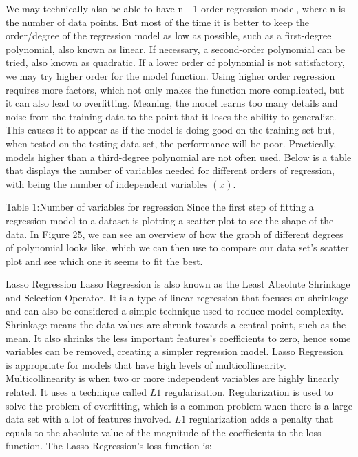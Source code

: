 \documentclass[a4paper,12pt]{report}
\begin{document}
We may technically also be able to have n - 1 order regression model, where n is the number of data points. But most of the time it is better to keep the order/degree of the regression model as low as possible, such as a first-degree polynomial, also known as linear. If necessary, a second-order polynomial can be tried, also known as quadratic. If a lower order of polynomial is not satisfactory, we may try higher order for the model function. Using higher order regression requires more factors, which not only makes the function more complicated, but it can also lead to overfitting. Meaning, the model learns too many details and noise from the training data to the point that it loses the ability to generalize. This causes it to appear as if the model is doing good on the training set but, when tested on the testing data set, the performance will be poor. Practically, models higher than a third-degree polynomial are not often used. Below is a table that displays the number of variables needed for different orders of regression, with  being the number of independent variables $(x)$.

Table 1:Number of variables for regression
Since the first step of fitting a regression model to a dataset is plotting a scatter plot to see the shape of the data. In Figure 25, we can see an overview of how the graph of different degrees of polynomial looks like, which we can then use to compare our data set’s scatter plot and see which one it seems to fit the best. 

Lasso Regression
Lasso Regression is also known as the Least Absolute Shrinkage and Selection Operator. It is a type of linear regression that focuses on shrinkage and can also be considered a simple technique used to reduce model complexity. Shrinkage means the data values are shrunk towards a central point, such as the mean. It also shrinks the less important features’s coefficients to zero, hence some variables can be removed, creating a simpler regression model. Lasso Regression is appropriate for models that have high levels of multicollinearity. Multicollinearity is when two or more independent variables are highly linearly related. It uses a technique called $L1$ regularization. Regularization is used to solve the problem of overfitting, which is a common problem when there is a large data set with a lot of features involved. $L1$ regularization adds a penalty that equals to the absolute value of the magnitude of the coefficients to the loss function. The Lasso Regression’s loss function is:
\end{document}
